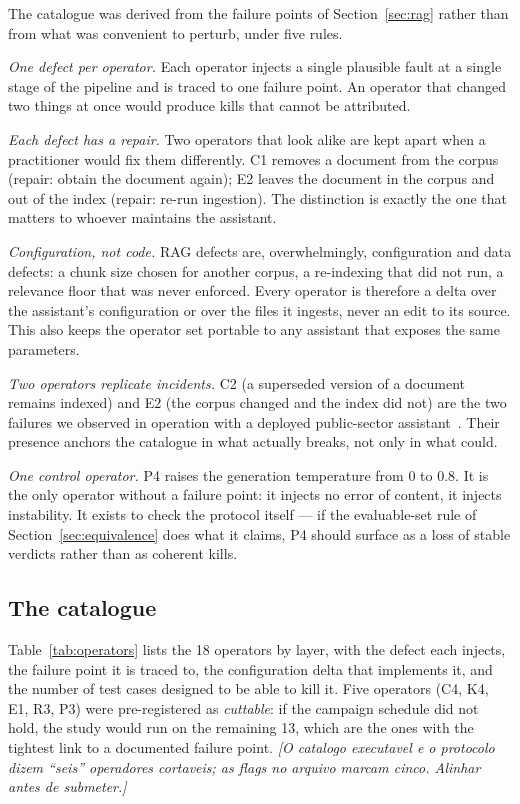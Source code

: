 \documentclass[a4paper,fleqn]{cas-dc}
\newcommand{\nota}[1]{{\color{blue}\itshape [#1]}}
\begin{document}
The catalogue was derived from the failure points of
Section~\ref{sec:rag} rather than from what was convenient to perturb, under
five rules.

\emph{One defect per operator.} Each operator injects a single plausible fault
at a single stage of the pipeline and is traced to one failure point. An
operator that changed two things at once would produce kills that cannot be
attributed.

\emph{Each defect has a repair.} Two operators that look alike are kept apart
when a practitioner would fix them differently. C1 removes a document from the
corpus (repair: obtain the document again); E2 leaves the document in the
corpus and out of the index (repair: re-run ingestion). The distinction is
exactly the one that matters to whoever maintains the assistant.

\emph{Configuration, not code.} RAG defects are, overwhelmingly, configuration
and data defects: a chunk size chosen for another corpus, a re-indexing that
did not run, a relevance floor that was never enforced. Every operator is
therefore a delta over the assistant's configuration or over the files it
ingests, never an edit to its source. This also keeps the operator set
portable to any assistant that exposes the same parameters.

\emph{Two operators replicate incidents.} C2 (a superseded version of a
document remains indexed) and E2 (the corpus changed and the index did not) are
the two failures we observed in operation with a deployed public-sector
assistant~\cite{oliveira2026sast}. Their presence anchors the catalogue in what
actually breaks, not only in what could.

\emph{One control operator.} P4 raises the generation temperature from 0 to
0.8. It is the only operator without a failure point: it injects no error of
content, it injects instability. It exists to check the protocol itself --- if
the evaluable-set rule of Section~\ref{sec:equivalence} does what it claims, P4
should surface as a loss of stable verdicts rather than as coherent kills.

\subsection{The catalogue}
\label{sec:catalogue}

Table~\ref{tab:operators} lists the 18 operators by layer, with the defect
each injects, the failure point it is traced to, the configuration delta that
implements it, and the number of test cases designed to be able to kill it.
Five operators (C4, K4, E1, R3, P3) were pre-registered as \emph{cuttable}: if
the campaign schedule did not hold, the study would run on the remaining 13,
which are the ones with the tightest link to a documented failure point.
\nota{O catalogo executavel e o protocolo dizem ``seis'' operadores
cortaveis; as flags no arquivo marcam cinco. Alinhar antes de submeter.}
\end{document}

